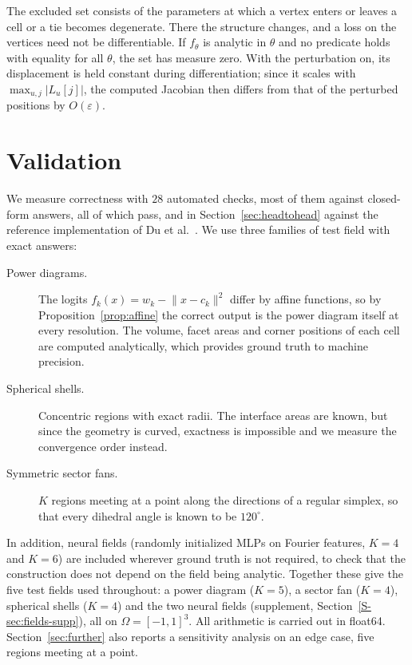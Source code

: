 \documentclass{egpubl}
\newcommand{\sref}[1]{\ref*{S-#1}}
\newcommand{\suppp}[1]{supplement, Section~\sref{#1}}
\theoremstyle{definition}
\begin{document}
\noindent The excluded set consists of the parameters at which a vertex
enters or leaves a cell or a tie becomes degenerate. There the structure
changes, and a loss on the vertices need not be differentiable. If
$f_\theta$ is analytic in $\theta$ and no predicate holds with equality for
all $\theta$, the set has measure zero.
With the perturbation on, its displacement is held constant during
differentiation; since it scales with $\max_{u,j}|L_u[j]|$, the computed
Jacobian then differs from that of the perturbed positions by
$O(\varepsilon)$.

\section{Validation}
\label{sec:experiments}

We measure correctness with $28$ automated checks, most of them against
closed-form answers, all of which pass, and in Section~\ref{sec:headtohead} against
the reference implementation of Du et al.~\cite{du2022}. We use three families of test field
with exact answers:

\begin{description}
\item[Power diagrams.] The logits $f_k(x) = w_k - \lVert x - c_k\rVert^2$
differ by affine functions, so by
Proposition~\ref{prop:affine} the correct output is the power diagram itself
at every resolution. The volume, facet areas and corner positions of each cell
are computed analytically, which provides ground truth to machine precision.
\item[Spherical shells.] Concentric regions with exact radii. The interface
areas are known, but since the geometry is curved, exactness is impossible and
we measure the convergence order instead.
\item[Symmetric sector fans.] $K$ regions meeting at a point along the
directions of a regular simplex, so that every dihedral angle is known to be
$120^\circ$.
\end{description}

\noindent In addition, neural fields (randomly initialized MLPs on Fourier
features, $K=4$ and $K=6$) are included wherever ground truth is not required,
to check that the construction does not depend on the field being analytic.
Together these give the five test fields used throughout: a power diagram
($K=5$), a sector fan ($K=4$), spherical shells ($K=4$) and the two neural
fields (\suppp{sec:fields-supp}), all on $\Omega = [-1,1]^3$. All arithmetic
is carried out in float64.
Section~\ref{sec:further} also reports a sensitivity analysis on an
edge case, five regions meeting at a point.
\end{document}
